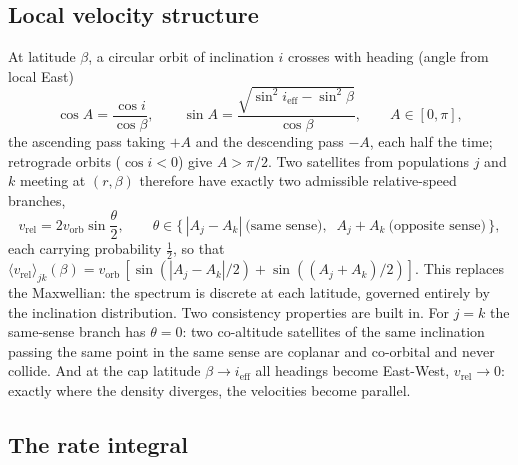 \documentclass[11pt,a4paper]{article}
\newcommand{\vrel}{v_{\mathrm{rel}}}
\newcommand{\vorb}{v_{\mathrm{orb}}}
\newcommand{\ieff}{i_{\mathrm{eff}}}
\begin{document}
\subsection{Local velocity structure}

At latitude $\beta$, a circular orbit of inclination $i$ crosses with heading
(angle from local East)
\begin{equation}
\cos A = \frac{\cos i}{\cos\beta}, \qquad
\sin A = \frac{\sqrt{\sin^2 \ieff - \sin^2 \beta}}{\cos\beta},
\qquad A \in [0, \pi],
\end{equation}
the ascending pass taking $+A$ and the descending pass $-A$, each half the time;
retrograde orbits ($\cos i < 0$) give $A > \pi/2$. Two satellites from populations
$j$ and $k$ meeting at $(r,\beta)$ therefore have exactly two admissible
relative-speed branches,
\begin{equation}
\vrel = 2\vorb \sin\frac{\theta}{2}, \qquad
\theta \in \{\, |A_j - A_k| \ \text{(same sense)},\;\; A_j + A_k \ \text{(opposite sense)} \,\},
\label{eq:vrelbranches}
\end{equation}
each carrying probability $\tfrac12$, so that
$\langle \vrel \rangle_{jk}(\beta) = \vorb\,[\sin(|A_j - A_k|/2) + \sin((A_j+A_k)/2)]$.
This replaces the Maxwellian: the spectrum is discrete at each latitude, governed
entirely by the inclination distribution. Two consistency properties are built in.
For $j = k$ the same-sense branch has $\theta = 0$: two co-altitude satellites of the
same inclination passing the same point in the same sense are coplanar and co-orbital
and never collide. And at the cap latitude $\beta \to \ieff$ all headings become
East-West, $\vrel \to 0$: exactly where the density diverges, the velocities become
parallel.

\subsection{The rate integral}
\end{document}
